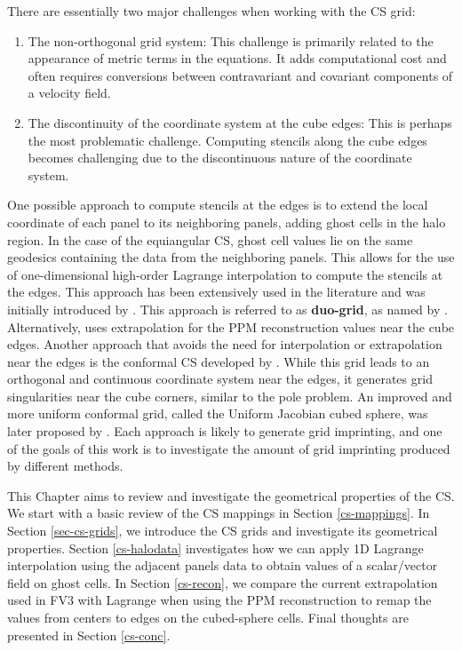 There are essentially two major challenges when working with the CS grid:
\begin{enumerate}
\item
The non-orthogonal grid system: This challenge is primarily related to the appearance of
metric terms in the equations. It adds computational cost and often requires conversions
between contravariant and covariant components of a velocity field.
\item
The discontinuity of the coordinate system at the cube edges: This is perhaps the most 
problematic challenge. Computing stencils along the cube edges becomes challenging due to 
the discontinuous nature of the coordinate system.
\end{enumerate}
One possible approach to compute stencils at the edges is to extend the local coordinate 
of each panel to its neighboring panels, adding ghost cells in the halo region. In the 
case of the equiangular CS, ghost cell values lie on the same geodesics 
containing the data from the neighboring panels. This allows for the use of one-dimensional
high-order Lagrange interpolation to compute the stencils at the edges. 
This approach has been extensively used in the literature \citep{croisille:2013, 
katta:2015, katta:2015b, chen:2021} and was initially introduced by \citet{ronchi:1996}.
This approach is referred to as \textbf{duo-grid}, as named by \citet{chen:2021}.
Alternatively, \citet{putman:2007} uses extrapolation for the PPM reconstruction values near the cube edges.
Another approach that avoids the need for interpolation or extrapolation near the edges is 
the conformal CS developed by \citet{rancic:1996}. While this grid leads to an 
orthogonal and continuous coordinate system near the edges, it generates grid singularities
near the cube corners, similar to the pole problem. 
An improved and more uniform conformal grid, called the Uniform Jacobian cubed sphere, was 
later proposed by \citet{rancic:2017}.
Each approach is likely to generate grid imprinting, and one of the goals of this work is 
to investigate the amount of grid imprinting produced by different methods.

This Chapter aims to review and investigate the geometrical properties of the CS.
We start with a basic review of the CS mappings in Section \ref{cs-mappings}.
In Section \ref{sec-cs-grids}, we introduce the CS grids and investigate its geometrical properties.
Section \ref{cs-halodata} investigates how we can apply 1D Lagrange interpolation using the adjacent panels
data to obtain values of a scalar/vector field on ghost cells.
In Section \ref{cs-recon}, we compare the current extrapolation used in FV3 with Lagrange when using the PPM reconstruction to
remap the values from centers to edges on the cubed-sphere cells.
Final thoughts are presented in Section \ref{cs-conc}.

